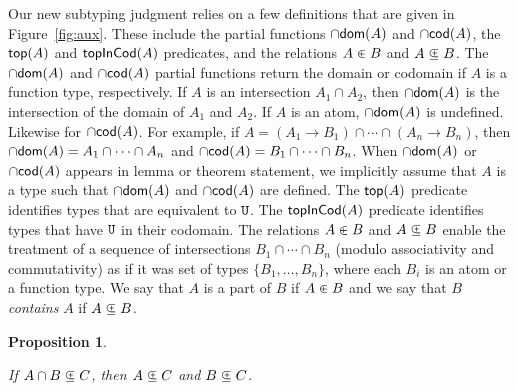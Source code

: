 \documentclass{article}
\newtheorem{proposition}[theorem]{Proposition}
\begin{document}
Our new subtyping judgment relies on a few definitions that are given
in Figure~\ref{fig:aux}. These include the partial functions $\cap\mathsf{dom}(A)$
and $\cap\mathsf{cod}(A)$, the $\mathsf{top}(A)$ and $\mathsf{topInCod}(A)$ predicates, and the
relations $A \inplus B$ and $A \subsetpluseq B$.
%
The $\cap\mathsf{dom}(A)$ and $\cap\mathsf{cod}(A)$ partial functions return the domain or
codomain if $A$ is a function type, respectively. If $A$ is an
intersection $A_1 \cap A_2$, then $\cap\mathsf{dom}(A)$ is the intersection of the
domain of $A_1$ and $A_2$.  If $A$ is an atom, $\cap\mathsf{dom}(A)$ is
undefined. Likewise for $\cap\mathsf{cod}(A)$. For example, if $A = (A_1 \to B_1)
\cap \cdots \cap (A_n \to B_n)$, then $\cap\mathsf{dom}(A) = A_1 \cap \cdots \cap
A_n$ and $\cap\mathsf{cod}(A) = B_1 \cap \cdots \cap B_n$.  When $\cap\mathsf{dom}(A)$ or
$\cap\mathsf{cod}(A)$ appears in lemma or theorem statement, we implicitly assume
that $A$ is a type such that $\cap\mathsf{dom}(A)$ and $\cap\mathsf{cod}(A)$ are defined.
%
The $\mathsf{top}(A)$ predicate identifies types that are equivalent to
$\mathtt{U}$. The $\mathsf{topInCod}(A)$ predicate identifies types that have $\mathtt{U}$
in their codomain.
%
The relations $A \inplus B$ and $A \subsetpluseq B$ enable the treatment
of a sequence of intersections $B_1 \cap \cdots \cap B_n$ (modulo
associativity and commutativity) as if it was set of types $\{ B_1,
\ldots, B_n \}$, where each $B_i$ is an atom or a function type.  We
say that $A$ is a part of $B$ if $A \inplus B$ and we say that $B$
\emph{contains} $A$ if $A \subsetpluseq B$.

\begin{proposition}\label{prop:union-subset-inv}
 \item If $A \cap B \subsetpluseq C$, then $A \subsetpluseq C$ and $B \subsetpluseq C$. 
\end{proposition}
\end{document}
